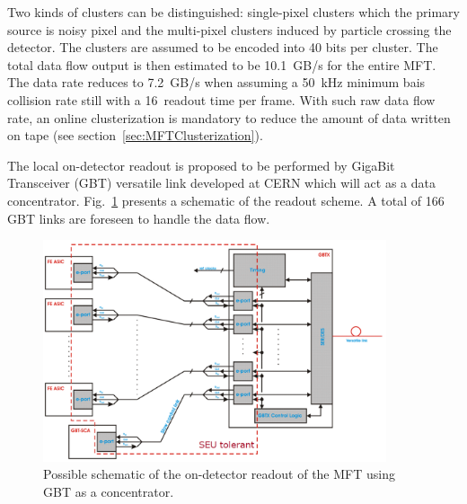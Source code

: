 Two kinds of clusters can be distinguished: single-pixel clusters which the primary source is noisy pixel and the multi-pixel clusters induced by particle crossing the detector. 
The clusters are assumed to be encoded into 40 bits per cluster.
The total data flow output is then estimated to be 10.1~GB/s for the entire MFT.
The data rate reduces to 7.2~GB/s when assuming a 50~kHz minimum bais \pbpb collision rate still with a 16~\ums readout time per frame.
With such raw data flow rate, an online clusterization is mandatory to reduce the amount of data written on tape (see section~\ref{sec:MFTClusterization}).

The local on-detector readout is proposed to be performed by GigaBit Transceiver (GBT) versatile link developed at CERN which will act as a data concentrator.
Fig.~\ref{fig:mft:schematic} presents a schematic of the readout scheme.
A total of 166 GBT links are foreseen to  handle the data flow.

\begin{figure}[h]
\centering
\includegraphics[width=0.9\textwidth]{MFT/Schematic.pdf}
\caption{\label{fig:mft:schematic} 
Possible schematic of the on-detector readout of the MFT using GBT as a concentrator.}
\end{figure}

